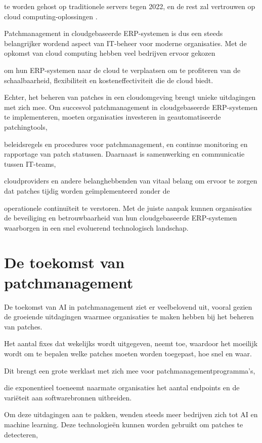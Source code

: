 te worden gehost op traditionele servers tegen 2022, en de rest zal vertrouwen op cloud computing-oplossingen \autocite{Pimentel2017}.

Patchmanagement in cloudgebaseerde ERP-systemen is dus een steeds belangrijker wordend aspect van IT-beheer voor moderne organisaties. Met de opkomst van cloud computing hebben veel bedrijven ervoor gekozen

om hun ERP-systemen naar de cloud te verplaatsen om te profiteren van de schaalbaarheid, flexibiliteit en kosteneffectiviteit die de cloud biedt. 

Echter, het beheren van patches in een cloudomgeving brengt unieke uitdagingen met zich mee.
Om succesvol patchmanagement in cloudgebaseerde ERP-systemen te implementeren, moeten organisaties investeren in geautomatiseerde patchingtools, 

beleidsregels en procedures voor patchmanagement, en continue monitoring en rapportage van patch statussen. Daarnaast is samenwerking en communicatie tussen IT-teams, 

cloudproviders en andere belanghebbenden van vitaal belang om ervoor te zorgen dat patches tijdig worden geïmplementeerd zonder de 

operationele continuïteit te verstoren. Met de juiste aanpak kunnen organisaties de beveiliging en betrouwbaarheid van hun cloudgebaseerde ERP-systemen waarborgen in een snel evoluerend technologisch landschap.


\section{De toekomst van patchmanagement}
De toekomst van AI in patchmanagement ziet er veelbelovend uit, vooral gezien de groeiende uitdagingen waarmee organisaties te maken hebben bij het beheren van patches.

Het aantal fixes dat wekelijks wordt uitgegeven, neemt toe, waardoor het moeilijk wordt om te bepalen welke patches moeten worden toegepast, hoe snel en waar. 

Dit brengt een grote werklast met zich mee voor patchmanagementprogramma's, 

die exponentieel toeneemt naarmate organisaties het aantal endpoints en de variëteit aan softwarebronnen uitbreiden.

Om deze uitdagingen aan te pakken, wenden steeds meer bedrijven zich tot AI en machine learning. Deze technologieën kunnen worden gebruikt om patches te detecteren, 

